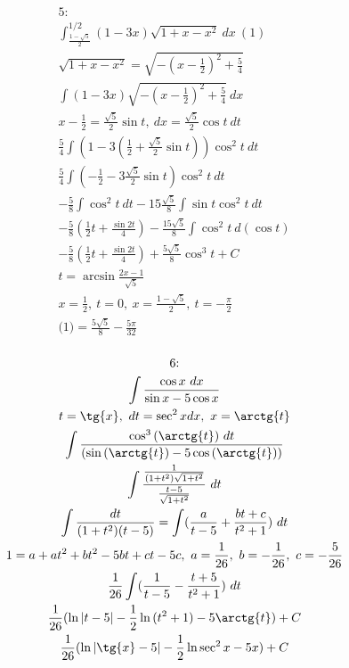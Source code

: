 \begin{multline}
    \text{5:}\\
    \int_{\frac{1 - \sqrt{5}}{2}}^{1/2} (1 - 3x) \sqrt{1 + x - x^{2}}\ dx\ (1)\\
    \sqrt{1 + x - x^{2}} = \sqrt{-(x - \frac{1}{2})^{2} + \frac{5}{4}}\\
    \int (1 - 3x) \sqrt{-(x - \frac{1}{2})^{2} + \frac{5}{4}}\ dx\\
    x - \frac{1}{2} = \frac{\sqrt{5}}{2} \sin{t},\ dx = \frac{\sqrt{5}}{2} \cos{t}\ dt\\
    \frac{5}{4} \int (1 - 3(\frac{1}{2} + \frac{\sqrt{5}}{2} \sin{t})) \cos^{2}{t}\ dt\\
    \frac{5}{4} \int (-\frac{1}{2} - 3\frac{\sqrt{5}}{2} \sin{t}) \cos^{2}{t}\ dt\\
    -\frac{5}{8} \int \cos^{2}{t}\ dt - 15 \frac{\sqrt{5}}{8}
    \int {\sin{t} \cos^{2}{t}\ dt}\\
    -\frac{5}{8}(\frac{1}{2}t + \frac{\sin{2t}}{4}) - 
    \frac{15\sqrt{5}}{8} \int \cos^{2}{t}\ d(\cos{t})\\
    - \frac{5}{8}(\frac{1}{2}t + \frac{\sin{2t}}{4}) + 
    \frac{5\sqrt{5}}{8} \cos^{3}{t} + C\\
    t = \arcsin{\frac{2x - 1}{\sqrt{5}}}\\
    x = \frac{1}{2},\ t = 0,\ x = \frac{1 - \sqrt{5}}{2},\ t = - \frac{\pi}{2}\\
    \text{(1)} = \frac{5 \sqrt{5}}{8} - \frac{5 \pi}{32}\\
\end{multline}


\begin{multline}
    \text{6:}\\
    \int \frac{\cos{x}\ dx}{\sin{x} - 5\cos{x}}\\
    t = \tg{x},\ dt = \sec^{2}{x} dx,\ x = \arctg{t}\\
    \int \frac{\cos^{3}{(\arctg{t})}\ dt}{(\sin{(\arctg{t})} - 5\cos{(\arctg{t})})}\\
    \int \frac{\frac{1}{(1 + t^2)\sqrt{1 + t^2}}}{\frac{t - 5}{\sqrt{1 + t^2}}}\ dt\\
    \int \frac{dt}{(1 + t^2) (t - 5)} = \int (\frac{a}{t - 5} + \frac{bt + c}{t^2 + 1})\ dt\\
    1 = a + at^2 + bt^2 - 5bt + ct - 5c,\ a = \frac{1}{26},\ b = -\frac{1}{26},\ c = -\frac{5}{26}\\
    \frac{1}{26} \int (\frac{1}{t - 5} - \frac{t + 5}{t^2 + 1})\ dt\\
    \frac{1}{26} (\ln{|t - 5|} - \frac{1}{2} \ln{(t^2 + 1)} - 5 \arctg{t}) + C\\
    \frac{1}{26} (\ln{|\tg{x} - 5|} - \frac{1}{2} \ln{\sec^{2}{x}} - 5x) + C\\
\end{multline}

